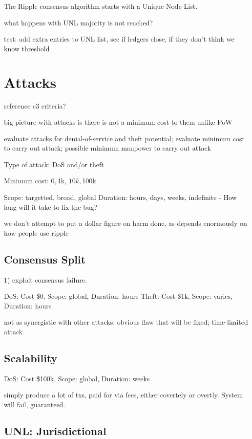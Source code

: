 \documentclass{article}
\begin{document}
The Ripple consensus algorithm starts with a Unique Node List. 


what happens with UNL majority is not reached?

test: add extra entries to UNL list, see if ledgers close, if they don't think we know threshold


\section{Attacks}

reference c3 criteria?

big picture with attacks is there is not a minimum cost to them unlike PoW

evaluate attacks for denial-of-service and theft potential; evaluate minimum
cost to carry out attack; possible minimum manpower to carry out attack


Type of attack: DoS and/or theft

Minimum cost: $0, $1k, $10k, $100k

Scope: targetted, broad, global
Duration: hours, days, weeks, indefinite - How long will it take to fix the bug?

we don't attempt to put a dollar figure on harm done, as depends enormously on
how people use ripple


\subsection{Consensus Split}

1) exploit consensus failure.

DoS: Cost \$0, Scope: global, Duration: hours
Theft: Cost \$1k, Scope: varies, Duration: hours

not as synergistic with other attacks; obvious flaw that will be fixed;
time-limited attack


\subsection{Scalability}

DoS: Cost \$100k, Scope: global, Duration: weeks

simply produce a lot of txs, paid for via fees, either covertely or overtly.
System will fail, guaranteed.


\subsection{UNL: Jurisdictional}
\end{document}
